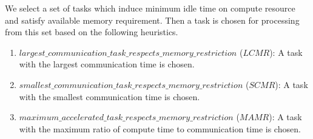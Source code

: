 \documentclass[sigconf]{acmart}
\begin{document}
	We select a set of tasks which induce minimum idle time on compute resource and satisfy available memory requirement. Then a task is chosen for processing from this set based on the following heuristics.
	\begin{enumerate}[label=\roman*)]
		
		\item $largest \_ \allowbreak communication \_ \allowbreak task \_ \allowbreak respects \_ \allowbreak memory \_ \allowbreak restriction$ ($LCMR$): A task with the largest communication time is chosen. 
		\item $smallest \_ \allowbreak communication \_ \allowbreak task \_ \allowbreak respects \_ \allowbreak memory \_ \allowbreak restriction$ ($SCMR$): A task with the smallest communication time is chosen.
		\item $maximum \_ \allowbreak accelerated \_ \allowbreak task \_ \allowbreak respects \_ \allowbreak memory \_ \allowbreak restriction$ \linebreak[4]($MAMR$): A task with the maximum ratio of compute time to communication time is chosen.
	\end{enumerate}
\end{document}
